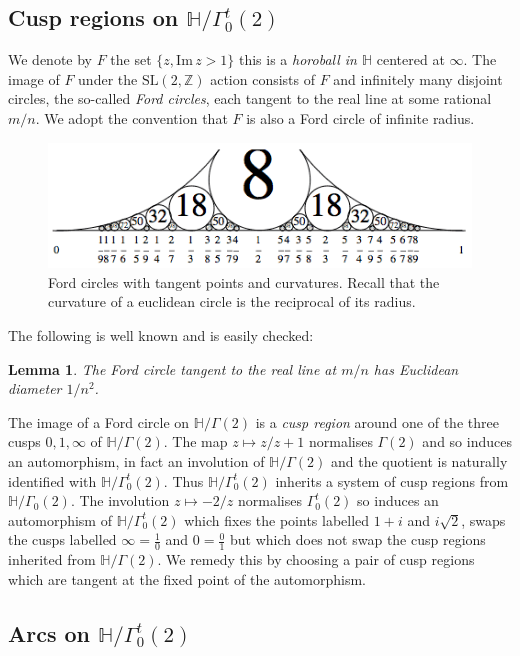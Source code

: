 \documentclass[12pt,a4paper]{amsart}
\newtheorem{lem}[thm]{Lemma}
\def\HH{\mathbb{H}}
\def\im{\mathrm{Im}\,}
\def\oo{\HH / \Gamma_0(2)}
\def\g2{\Gamma(2)}
\def\ah{\Gamma_0^t(2)}
\def\oot{\HH / \ah}
\def\xx{\HH/\g2}
\def\ZZ{\mathbb{Z}}
\def\sl2{\mathrm{SL}(2, \ZZ)}
\begin{document}
\subsection{Cusp regions  on $\oot$}

We denote by $F$ the set  $\{ z, \im z > 1\}$
this is a \textit{horoball in $\HH$} centered at $\infty$.
The image of $F$ under the $\sl2$ action consists of
$F$ and infinitely many disjoint circles, the so-called \textit{Ford circles}, 
each tangent to the real line at some rational $m/n$.
We adopt the convention that $F$ is also a Ford circle of infinite radius.
  \begin{figure}[ht]
\begin{center}
\includegraphics[scale=.8]{Ford-circles.png} 
\end{center}
\caption{Ford circles with tangent points and curvatures.
Recall that the curvature of a euclidean circle is the reciprocal of its radius.}
\end{figure}

The following is well known and is easily checked:

\begin{lem}\label{ford}
The Ford circle tangent to the real line at $m/n$
has Euclidean diameter $1/n^2$.
\end{lem}


The image of a Ford circle on $\xx$ is a \textit{cusp region}
around one of the three cusps $0,1,\infty$ of $\xx$.
The map $z\mapsto z/z+1$ normalises $\g2$
and so induces an automorphism, in fact an involution of $\xx$ and
the quotient is naturally identified with $\oot$.
Thus $\oot$ inherits a system of cusp regions from $\oo$.
The involution $z\mapsto -2/z$ normalises $\ah$ so induces an
automorphism of $\oot$ which fixes the points labelled
$1+i$ and $i\sqrt 2$, swaps the cusps labelled
$\infty=\frac{1}{0}$ and
$0= \frac{0}{1}$ but which does not swap the cusp regions inherited
from $\xx$.
We remedy this by choosing a pair of cusp regions which are tangent
at the fixed point of the automorphism.


\subsection{Arcs on $\oot$}
\end{document}
